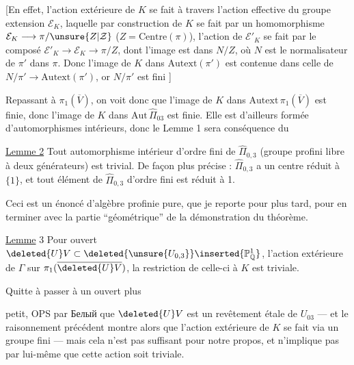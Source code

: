 
[En effet, l'action extérieure de $K$ se fait à travers l'action effective du groupe extension $\mathcal E_K$, laquelle par construction de $K$ se fait par un homomorphisme $\mathcal E_K\longrightarrow\pi/\unsure{Z|\mathcal Z}$ ($Z=\mathrm{Centre}(\pi)$),  l'action de $\mathcal E'_K$  se fait par le composé $\mathcal E'_K\longrightarrow\mathcal E_K\longrightarrow\pi/Z$, dont l'image est dans $N/Z$, où $N$ est le normalisateur de $\pi'$ dans $\pi$. Donc l'image de $K$ dans $\mathrm{Autext}(\pi')$ est contenue dans celle de $N/\pi'\longrightarrow\mathrm{Autext}(\pi')$, or $N/\pi'$ est fini ]

Repassant à $\pi_1(\overline V)$, on voit donc que l'image de $K$ dans $\mathrm{Autext}\,\pi_1(\overline V)$ est finie, donc l'image de $K$ dans $\mathrm{Aut}\,\widehat{\Pi}_{03}$ est finie. Elle est d'ailleurs formée d'automorphismes intérieurs, donc le Lemme 1 sera conséquence du

\uline{Lemme 2} Tout automorphisme intérieur d'ordre fini de $\widehat{\Pi}_{0,3}$ (groupe profini libre à deux générateurs) est trivial. De façon plus précise : $\widehat{\Pi}_{0,3}$ a un centre réduit à $\{1\}$, et tout élément de $\widehat{\Pi}_{0,3}$ d'ordre fini est réduit à 1.

Ceci est un énoncé d'algèbre profinie pure, que je reporte pour plus tard, pour en terminer avec la partie ``géométrique'' de la démonstration du théorème.

\uline{Lemme} 3 Pour  ouvert  $\deleted{U}V\subset\deleted{\unsure{U_{0,3}}}\inserted{\mathbb P^1_{\mathbb Q}}$,  l'action extérieure de $\Gamma$ sur $\pi_1(\overline{\deleted{U}V})$, la restriction de celle-ci à $K$ est triviale.

Quitte à passer à un ouvert plus

petit, OPS par Белый que $\deleted{U}V$ est un revêtement étale de $U_{03}$ --- et le raisonnement précédent montre alors que l'action extérieure de $K$ se fait via un groupe  fini --- mais cela n'est pas suffisant pour notre propos, et n'implique pas par lui-même que cette action soit triviale.

